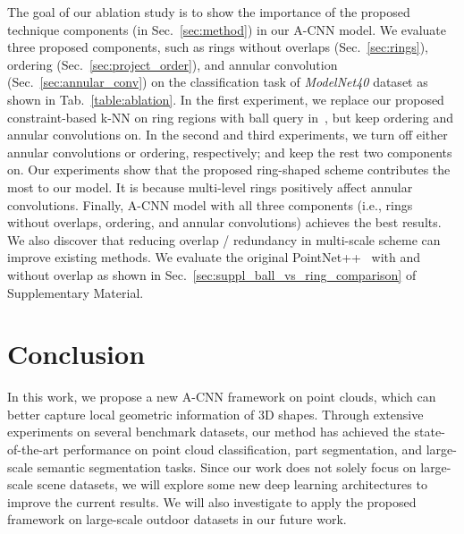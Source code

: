 \documentclass[10pt,twocolumn,letterpaper]{article}
\begin{document}
The goal of our ablation study is to show the importance of the proposed technique components (in Sec.~\ref{sec:method}) in our A-CNN model. We evaluate three proposed components, such as rings without overlaps (Sec.~\ref{sec:rings}), ordering (Sec.~\ref{sec:project_order}), and annular convolution (Sec.~\ref{sec:annular_conv}) on the classification task of \emph{ModelNet40} dataset as shown in Tab.~\ref{table:ablation}. In the first experiment, we replace our proposed constraint-based k-NN on ring regions with ball query in~\cite{qi2017pointnet++}, but keep ordering and annular convolutions on. In the second and third experiments, we turn off either annular convolutions or ordering, respectively; and keep the rest two components on. Our experiments show that the proposed ring-shaped scheme contributes the most to our model. It is because multi-level rings positively affect annular convolutions. Finally, A-CNN model with all three components (i.e., rings without overlaps, ordering, and annular convolutions) achieves the best results. We also discover that reducing overlap / redundancy in multi-scale scheme can improve existing methods. We evaluate the original PointNet++~\cite{qi2017pointnet++} with and without overlap as shown in Sec.~\ref{sec:suppl_ball_vs_ring_comparison} of Supplementary Material.\vspace{-2mm}
\begin{table}[h]
\centering
\caption{Ablation experiments on \emph{ModelNet40} dataset. AAC is accuracy average class, OA is overall accuracy.}\vspace{-2mm}
\vspace{-2mm}
\label{table:ablation}
\end{table}
\vspace{-3mm}
\section{Conclusion}\vspace{-1mm}
In this work, we propose a new A-CNN framework on point clouds, which can better capture local geometric information of 3D shapes. Through extensive experiments on several benchmark datasets, our method has achieved the state-of-the-art performance on point cloud classification, part segmentation, and large-scale semantic segmentation tasks. Since our work does not solely focus on large-scale scene datasets, we will explore some new deep learning architectures to improve the current results. We will also investigate to apply the proposed framework on large-scale outdoor datasets in our future work.
\end{document}
